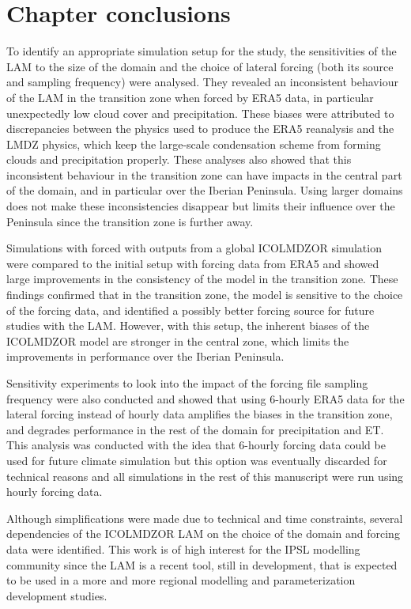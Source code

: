 \clearpage

\section{Chapter conclusions}

To identify an appropriate simulation setup for the study, the sensitivities of the LAM to the size of the domain and the choice of lateral forcing (both its source and sampling frequency) were analysed. They revealed an inconsistent behaviour of the LAM in the transition zone when forced by ERA5 data, in particular unexpectedly low cloud cover and precipitation. These biases were attributed to discrepancies between the physics used to produce the ERA5 reanalysis and the LMDZ physics, which keep the large-scale condensation scheme from forming clouds and precipitation properly.
These analyses also showed that this inconsistent behaviour in the transition zone can have impacts in the central part of the domain, and in particular over the Iberian Peninsula. Using larger domains does not make these inconsistencies disappear but limits their influence over the Peninsula since the transition zone is further away.

Simulations with forced with outputs from a global ICOLMDZOR simulation were compared to the initial setup with forcing data from ERA5 and showed large improvements in the consistency of the model in the transition zone. These findings confirmed that in the transition zone, the model is sensitive to the choice of the forcing data, and identified a possibly better forcing source for future studies with the LAM. However, with this setup, the inherent biases of the ICOLMDZOR model are stronger  in the central zone, which limits the improvements in performance over the Iberian Peninsula.

Sensitivity experiments to look into the impact of the forcing file sampling frequency were also conducted and showed that using 6-hourly ERA5 data for the lateral forcing instead of hourly data amplifies the biases in the transition zone, and degrades performance in the rest of the domain for precipitation and ET. This analysis was conducted with the idea that 6-hourly forcing data could be used for future climate simulation but this option was eventually discarded for technical reasons and all simulations in the rest of this manuscript were run using hourly forcing data.

Although simplifications were made due to technical and time constraints, several dependencies of the ICOLMDZOR LAM on the choice of the domain and forcing data were identified. This work is of high interest for the IPSL modelling community since the LAM is a recent tool, still in development, that is expected to be used in a more and more regional modelling and parameterization development studies.
